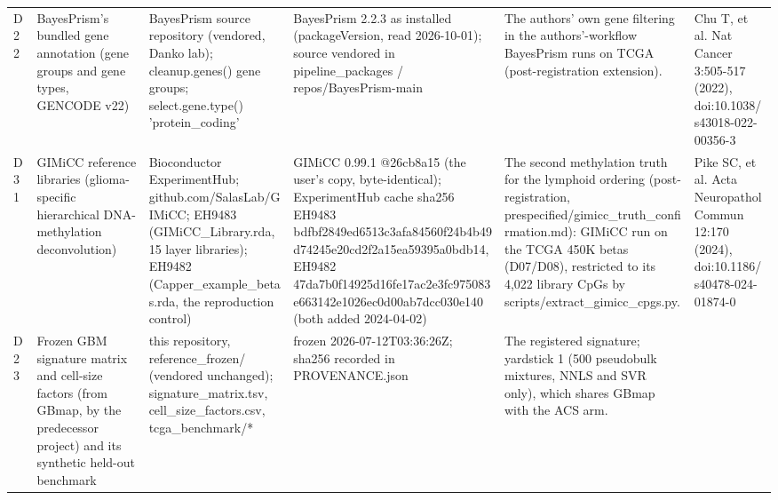 \begin{table}[htbp]
\begin{tabular}{llllll}
D22 & BayesPrism's bundled gene annotation (gene groups and gene types, GENCODE v22) & BayesPrism source repository (vendored, Danko lab); cleanup.genes() gene groups; select.gene.type() 'protein\_coding' & BayesPrism 2.2.3 as installed (packageVersion, read 2026-10-01); source vendored in pipeline\_packages / repos/BayesPrism-main & The authors' own gene filtering in the authors'-workflow BayesPrism runs on TCGA (post-registration extension). & Chu T, et al. Nat Cancer 3:505-517 (2022), doi:10.1038/s43018-022-00356-3 \\
D31 & GIMiCC reference libraries (glioma-specific hierarchical DNA-methylation deconvolution) & Bioconductor ExperimentHub; github.com/SalasLab/GIMiCC; EH9483 (GIMiCC\_Library.rda, 15 layer libraries); EH9482 (Capper\_example\_betas.rda, the reproduction control) & GIMiCC 0.99.1 @26cb8a15 (the user's copy, byte-identical); ExperimentHub cache sha256 EH9483 bdfbf2849ed6513c3afa84560f24b4b49d74245e20cd2f2a15ea59395a0bdb14, EH9482 47da7b0f14925d16fe17ac2e3fc975083e663142e1026ec0d00ab7dcc030e140 (both added 2024-04-02) & The second methylation truth for the lymphoid ordering (post-registration, prespecified/gimicc\_truth\_confirmation.md): GIMiCC run on the TCGA 450K betas (D07/D08), restricted to its 4,022 library CpGs by scripts/extract\_gimicc\_cpgs.py. & Pike SC, et al. Acta Neuropathol Commun 12:170 (2024), doi:10.1186/s40478-024-01874-0 \\
D23 & Frozen GBM signature matrix and cell-size factors (from GBmap, by the predecessor project) and its synthetic held-out benchmark & this repository, reference\_frozen/ (vendored unchanged); signature\_matrix.tsv, cell\_size\_factors.csv, tcga\_benchmark/* & frozen 2026-07-12T03:36:26Z; sha256 recorded in PROVENANCE.json & The registered signature; yardstick 1 (500 pseudobulk mixtures, NNLS and SVR only), which shares GBmap with the ACS arm. &  \\
\bottomrule
\end{tabular}
\end{table}

